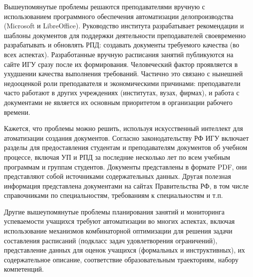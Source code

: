 \documentclass[
]{aiitart}
\begin{document}
Вышеупомянутые проблемы решаются преподавателями вручную с использованием программного обеспечения автоматизации делопроизводства (Microsoft и LibreOffice).  Руководство института разрабатывает рекомендации и шаблоны документов для поддержки деятельности преподавателей своевременно разрабатывать и обновлять РПД: создавать документы требуемого качества (во всех аспектах). Разработанные вручную расписания занятий публикуются на сайте ИГУ сразу после их формирования. Человеческий фактор проявляется в ухудшении качества выполнения требований. Частично это связано с нынешней недооценкой роли преподавателя и экономическими причинами: преподаватели часто работают в других учреждениях (институтах, вузах, фирмах), и работа с документами не является их основным приоритетом в организации рабочего времени.

Кажется, что проблемы можно решить, используя искусственный интеллект для атоматизации создания документов. Согласно законодательству РФ ИГУ включает разделы для предоставления студентам и преподавателям документов об учебном процессе, включая УП и РПД за последние несколько лет по всем учебным программам и группам студентов. Документы представлены в формате PDF, они представляют собой источниками содержательных данных.  Другая полезная информация представлена документами на сайтах Правительства РФ, в том числе справочниками по специальностям, требованиям к специальностям и т.п.

Другие вышеупомянутые проблемы планирования занятий и мониторинга успеваемости учащихся требуют автоматизации во многих аспектах, включая использование механизмов комбинаторной оптимизации для решения задачи составления расписаний (подкласс задач удовлетворения ограничений), представление данных для оценок учащихся (формальных и инструктивных), их содержательное описание, соответствие образовательным траекториям, набору компетенций.
\end{document}
